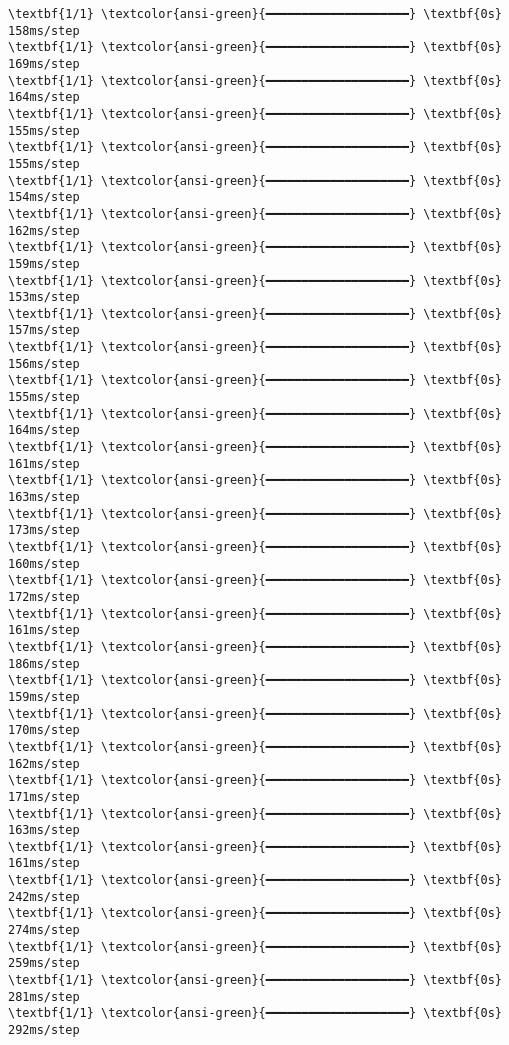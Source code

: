 \documentclass[11pt]{article}
\begin{document}
    \begin{Verbatim}[commandchars=\\\{\}]
\textbf{1/1} \textcolor{ansi-green}{━━━━━━━━━━━━━━━━━━━━} \textbf{0s} 158ms/step
\textbf{1/1} \textcolor{ansi-green}{━━━━━━━━━━━━━━━━━━━━} \textbf{0s} 169ms/step
\textbf{1/1} \textcolor{ansi-green}{━━━━━━━━━━━━━━━━━━━━} \textbf{0s} 164ms/step
\textbf{1/1} \textcolor{ansi-green}{━━━━━━━━━━━━━━━━━━━━} \textbf{0s} 155ms/step
\textbf{1/1} \textcolor{ansi-green}{━━━━━━━━━━━━━━━━━━━━} \textbf{0s} 155ms/step
\textbf{1/1} \textcolor{ansi-green}{━━━━━━━━━━━━━━━━━━━━} \textbf{0s} 154ms/step
\textbf{1/1} \textcolor{ansi-green}{━━━━━━━━━━━━━━━━━━━━} \textbf{0s} 162ms/step
\textbf{1/1} \textcolor{ansi-green}{━━━━━━━━━━━━━━━━━━━━} \textbf{0s} 159ms/step
\textbf{1/1} \textcolor{ansi-green}{━━━━━━━━━━━━━━━━━━━━} \textbf{0s} 153ms/step
\textbf{1/1} \textcolor{ansi-green}{━━━━━━━━━━━━━━━━━━━━} \textbf{0s} 157ms/step
\textbf{1/1} \textcolor{ansi-green}{━━━━━━━━━━━━━━━━━━━━} \textbf{0s} 156ms/step
\textbf{1/1} \textcolor{ansi-green}{━━━━━━━━━━━━━━━━━━━━} \textbf{0s} 155ms/step
\textbf{1/1} \textcolor{ansi-green}{━━━━━━━━━━━━━━━━━━━━} \textbf{0s} 164ms/step
\textbf{1/1} \textcolor{ansi-green}{━━━━━━━━━━━━━━━━━━━━} \textbf{0s} 161ms/step
\textbf{1/1} \textcolor{ansi-green}{━━━━━━━━━━━━━━━━━━━━} \textbf{0s} 163ms/step
\textbf{1/1} \textcolor{ansi-green}{━━━━━━━━━━━━━━━━━━━━} \textbf{0s} 173ms/step
\textbf{1/1} \textcolor{ansi-green}{━━━━━━━━━━━━━━━━━━━━} \textbf{0s} 160ms/step
\textbf{1/1} \textcolor{ansi-green}{━━━━━━━━━━━━━━━━━━━━} \textbf{0s} 172ms/step
\textbf{1/1} \textcolor{ansi-green}{━━━━━━━━━━━━━━━━━━━━} \textbf{0s} 161ms/step
\textbf{1/1} \textcolor{ansi-green}{━━━━━━━━━━━━━━━━━━━━} \textbf{0s} 186ms/step
\textbf{1/1} \textcolor{ansi-green}{━━━━━━━━━━━━━━━━━━━━} \textbf{0s} 159ms/step
\textbf{1/1} \textcolor{ansi-green}{━━━━━━━━━━━━━━━━━━━━} \textbf{0s} 170ms/step
\textbf{1/1} \textcolor{ansi-green}{━━━━━━━━━━━━━━━━━━━━} \textbf{0s} 162ms/step
\textbf{1/1} \textcolor{ansi-green}{━━━━━━━━━━━━━━━━━━━━} \textbf{0s} 171ms/step
\textbf{1/1} \textcolor{ansi-green}{━━━━━━━━━━━━━━━━━━━━} \textbf{0s} 163ms/step
\textbf{1/1} \textcolor{ansi-green}{━━━━━━━━━━━━━━━━━━━━} \textbf{0s} 161ms/step
\textbf{1/1} \textcolor{ansi-green}{━━━━━━━━━━━━━━━━━━━━} \textbf{0s} 242ms/step
\textbf{1/1} \textcolor{ansi-green}{━━━━━━━━━━━━━━━━━━━━} \textbf{0s} 274ms/step
\textbf{1/1} \textcolor{ansi-green}{━━━━━━━━━━━━━━━━━━━━} \textbf{0s} 259ms/step
\textbf{1/1} \textcolor{ansi-green}{━━━━━━━━━━━━━━━━━━━━} \textbf{0s} 281ms/step
\textbf{1/1} \textcolor{ansi-green}{━━━━━━━━━━━━━━━━━━━━} \textbf{0s} 292ms/step

\end{Verbatim}
\end{document}
